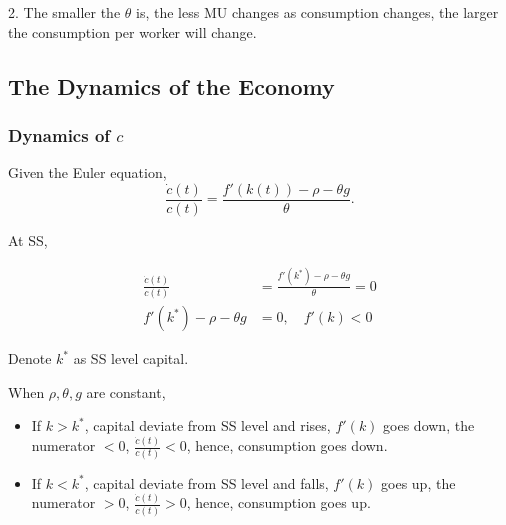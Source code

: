 \documentclass[12pt]{article}
\begin{document}
2. The smaller the $ \theta $ is, the less MU changes as consumption changes, the
larger the consumption per worker will change.





\subsection{The Dynamics of the Economy}

\subsubsection{Dynamics of $ c $}

Given the Euler equation,
\begin{equation*}
\frac{\dot{c}(t)}{c(t)} = \frac{f'(k(t)) - \rho - \theta g}{\theta}.
\end{equation*}

At SS, 

\begin{align*}
\frac{\dot{c}(t)}{c(t)} &= \frac{f'(k ^{*}) - \rho - \theta g}{\theta} = 0\\
f'(k ^{*}) - \rho - \theta g &= 0, \quad f'(k) < 0
\end{align*}

Denote $ k ^{*} $ as SS level capital.

When $ \rho, \theta, g $ are constant,
\begin{itemize}
\item If $ k > k ^{*} $, capital deviate from SS level and rises, $ f'(k) $ goes
		down, the numerator $ < 0 $, $ \frac{\dot{c}(t)}{c(t)} < 0 $, hence, consumption
		goes down.
\item If $ k < k ^{*} $, capital deviate from SS level and falls, $ f'(k) $ goes
		up, the numerator $ > 0 $, $ \frac{\dot{c}(t)}{c(t)} > 0 $, hence, consumption
		goes up.
\end{itemize}
\end{document}
